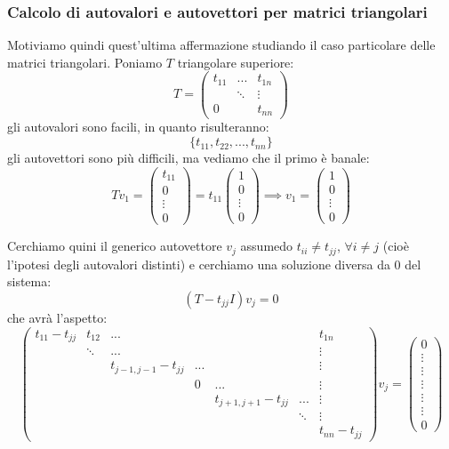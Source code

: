 \documentclass[a4paper,11pt]{article}
\begin{document}
\subsubsection{Calcolo di autovalori e autovettori per matrici triangolari}
Motiviamo quindi quest'ultima affermazione studiando il caso particolare delle matrici triangolari. 
Poniamo $T$ triangolare superiore:
$$
T = 
\begin{pmatrix}
	t_{11} & ... & t_{1n} \\ 
				 & \ddots & \vdots \\
	0 & & t_{nn}
\end{pmatrix}
$$
gli autovalori sono facili, in quanto risulteranno:
$$
\{ t_{11}, t_{22}, ..., t_{nn} \}
$$
gli autovettori sono più difficili, ma vediamo che il primo è banale:
$$
T v_1 = \begin{pmatrix}
	t_{11} \\ 0 \\ \vdots \\ 0
\end{pmatrix}
=
t_{11}
\begin{pmatrix}
	1 \\ 0 \\ \vdots \\ 0
\end{pmatrix}
\implies
v_1 = 
\begin{pmatrix}
	1 \\ 0 \\ \vdots \\ 0
\end{pmatrix}
$$

Cerchiamo quini il generico autovettore $v_j$ assumedo $t_{ii} \neq t_{jj}$, $\forall i \neq j$ (cioè l'ipotesi degli autovalori distinti) e cerchiamo una soluzione diversa da 0 del sistema:
$$
(T - t_{jj} I) v_j = 0
$$
che avrà l'aspetto:
$$
\begin{pmatrix}
	t_{11} - t_{jj} & t_{12} & ... & & & &  t_{1n} \\ 
									& \ddots & ... & & & &  \vdots \\
									& & t_{j-1,j-1} - t_{jj} & ... & & &  \vdots \\
									& & & 0 & ... &  &  \vdots \\
									& & & & t_{j+1,j+1} - t_{jj} & ... &  \vdots \\
									& & & & & \ddots &  \vdots \\
									& & & & & & t_{nn} - t_{jj}
\end{pmatrix}
v_j = 
\begin{pmatrix}
	0 \\ \vdots \\ \vdots \\ \vdots \\ \vdots \\ \vdots \\ 0
\end{pmatrix}
$$
\end{document}
